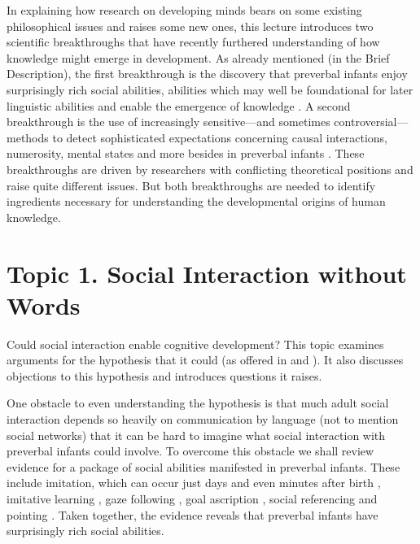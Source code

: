 \documentclass[12pt,\papersize]{extarticle}
\begin{document}
In explaining how research on developing minds bears on some existing philosophical issues and raises some new ones,
this lecture introduces two scientific breakthroughs that have recently furthered understanding of how knowledge might emerge in development.
As already mentioned (in the Brief Description), the first breakthrough is the discovery that preverbal infants enjoy surprisingly rich social abilities, abilities which
may well be foundational for later linguistic abilities and enable the emergence of knowledge \citep[e.g.][]{Csibra:2009xr,Meltzoff:2007pj,Tomasello:2005wx}. 
A second breakthrough is the use of increasingly sensitive---and sometimes controversial---methods to detect  sophisticated expectations concerning  causal interactions, numerosity, mental states and more besides in preverbal infants \citep[e.g.][]{Spelke:1990jn,Baillargeon:gx}.
These breakthroughs are driven by researchers with conflicting theoretical positions and raise quite different issues.  
But both breakthroughs are needed to identify ingredients necessary for understanding the developmental origins of human knowledge.



\section{Topic 1. Social Interaction without Words}
Could social interaction enable cognitive development? 
This topic examines arguments for the hypothesis that it could (as offered in \citealp{Tomasello:2003tq} and \citealp{Moll:2007gu}). 
It also discusses objections to this hypothesis and introduces questions it raises.
 
One obstacle to even understanding the hypothesis is that much adult social interaction depends so heavily on communication by language (not to mention social networks) that it can be hard to imagine what social interaction with preverbal infants could involve.
To overcome this obstacle we shall review evidence for a package of social abilities manifested in preverbal infants.
These include imitation, which can occur just days and even minutes after birth \citep{meltzoff:1977_imitation,field:1982_imitation,meltzoff:1983_newborn}, 
imitative learning \citep{carpenter:1998_fourteen}, 
gaze following \citep{Csibra:2008be},
goal ascription \citep{Gergely:1995sq,Woodward:2000jw},
social referencing \citep{Baldwin:2000qq} 
and 
pointing \citep{Liszkowski:2006ec}.  
Taken together, the evidence reveals that preverbal infants have surprisingly rich social abilities.
\end{document}
